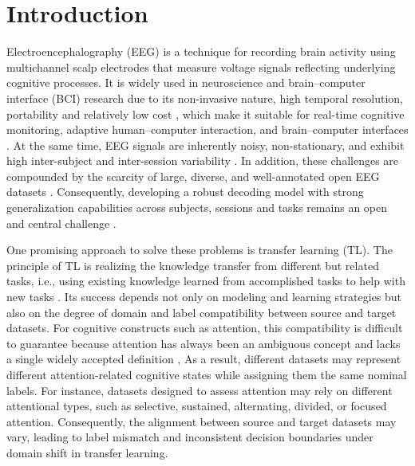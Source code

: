 \documentclass[utf8]{FrontiersinHarvard} %
\begin{document}
\section{Introduction}
Electroencephalography (EEG) is a technique for recording brain activity using multichannel scalp electrodes that measure voltage signals reflecting underlying cognitive processes. It is widely used in neuroscience and brain–computer interface (BCI) research due to its non-invasive nature, high temporal resolution, portability and relatively low cost  \citep{verma2023attentionet}, which make it suitable for real-time cognitive monitoring, adaptive human–computer
interaction, and brain–computer interfaces \citep{chen2025hybrid}. At the same time, EEG signals are inherently noisy, non-stationary, and exhibit high inter-subject and inter-session variability \citep{wu2022transfer_eeg_bci, Zhang2020SensorsEEGTransfer}.
In addition, these challenges are compounded by the scarcity of large, diverse, and well-annotated open EEG datasets \citep{sun2025attention_eeg_review}.
Consequently,  developing a robust decoding model with strong generalization capabilities across subjects, sessions and tasks remains an open and central challenge \citep{li2025foundation_models_survey, wu2022transfer_eeg_bci}. 


One promising approach to solve these problems is transfer learning (TL). The principle of TL is realizing the knowledge transfer from different but related tasks, i.e., using existing knowledge learned from accomplished tasks to help with new tasks \citep{Zhang2020SensorsEEGTransfer}. Its success depends not only on modeling and learning strategies but also on the degree of domain and label compatibility between source and target datasets. For cognitive constructs such as attention, this compatibility is difficult to guarantee because attention has always been an ambiguous concept and lacks a single widely accepted definition \citep{sun2025attention_eeg_review, hommel2019noone}, As a result, different datasets may represent different attention-related cognitive states while assigning them the same nominal labels. For instance, datasets designed to assess attention may rely on different attentional types, such as selective, sustained, alternating, divided, or focused attention. Consequently, the alignment between source and target datasets may vary, leading to label mismatch and inconsistent decision boundaries under domain shift in transfer learning.




\end{document}
